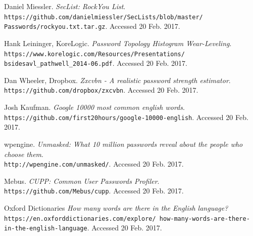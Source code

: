 \documentclass[11pt, a4paper]{article}
\begin{document}
\begin{thebibliography}{99}
Daniel Miessler.
\textit{SecList: RockYou List}.
\\\texttt{https://github.com/danielmiessler/SecLists/blob/master/
Passwords/rockyou.txt.tar.gz}.
Accessed 20 Feb. 2017.

Hank Leininger, KoreLogic.
\textit{Password Topology Histogram Wear-Leveling}.
\\\texttt{https://www.korelogic.com/Resources/Presentations/
bsidesavl\_pathwell\_2014-06.pdf}.
Accessed 20 Feb. 2017.

Dan Wheeler, Dropbox.
\textit{Zxcvbn - A realistic password strength estimator}.
\\\texttt{https://github.com/dropbox/zxcvbn}.
Accessed 20 Feb. 2017.

Josh Kaufman.
\textit{Google 10000 most common english words}.
\\\texttt{https://github.com/first20hours/google-10000-english}.
Accessed 20 Feb. 2017.

wpengine.
\textit{Unmasked: What 10 million passwords reveal about the people who choose them}.
\\\texttt{http://wpengine.com/unmasked/}.
Accessed 20 Feb. 2017.

Mebus.
\textit{CUPP: Common User Passwords Profiler}.
\\\texttt{https://github.com/Mebus/cupp}.
Accessed 20 Feb. 2017.

Oxford Dictionaries
\textit{How many words are there in the English language?}
\\\texttt{https://en.oxforddictionaries.com/explore/
how-many-words-are-there-in-the-english-language}.
Accessed 20 Feb. 2017.


\end{thebibliography}
\end{document}
